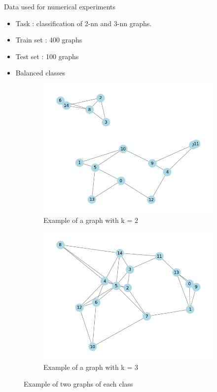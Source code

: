 \documentclass[french]{beamer}
\begin{document}
\begin{frame}{Data used for numerical experiments}

\begin{itemize}
    \item Task : classification of 2-nn and 3-nn graphs.\\[0.3cm]
    \item Train set : 400 graphs
    \item Test set : 100 graphs
    \item Balanced classes 
\end{itemize}

\begin{figure}[h]
    \centering
    \begin{subfigure}{0.4\textwidth}
        \includegraphics[width=\textwidth]{figures/graph_k2.png}
        \caption{Example of a graph with k = 2 }
    \end{subfigure}
    \begin{subfigure}{0.4\textwidth}
        \includegraphics[width=\textwidth]{figures/graph_k3.png}
        \caption{Example of a graph with k = 3}
    \end{subfigure}
    \caption{Example of two graphs of each class}
\end{figure} 

\end{frame}
\end{document}
